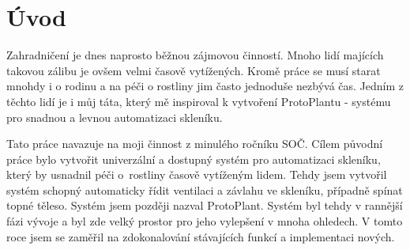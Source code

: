 \chapter*{Úvod}

Zahradničení je dnes naprosto běžnou zájmovou činností. Mnoho lidí majících takovou zálibu je ovšem velmi časově vytížených. Kromě práce se musí starat mnohdy i o rodinu a na péči o rostliny jim často jednoduše nezbývá čas. Jedním z těchto lidí je i můj táta, který mě inspiroval k vytvoření ProtoPlantu - systému pro snadnou a levnou automatizaci skleníku.

Tato práce navazuje na moji činnost z minulého ročníku SOČ. Cílem původní práce bylo vytvořit univerzální a dostupný systém pro automatizaci skleníku, který by usnadnil péči o~rostliny časově vytíženým lidem. Tehdy jsem vytvořil systém schopný automaticky řídit ventilaci a závlahu ve skleníku, případně spínat topné těleso. Systém jsem později nazval ProtoPlant.
Systém byl tehdy v rannější fázi vývoje a byl zde velký prostor pro jeho vylepšení v mnoha ohledech. V tomto roce jsem se zaměřil na zdokonalování stávajících funkcí a implementaci nových.

\newpage
